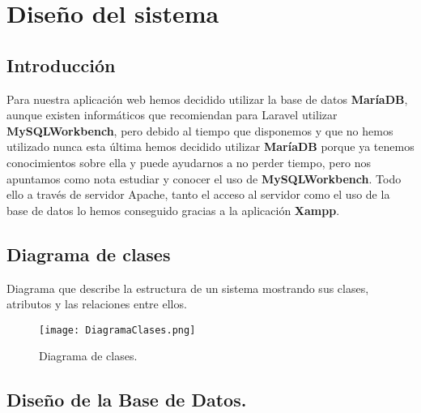 \documentclass{article}
\begin{document}
\section{Diseño del sistema }
\subsection{Introducción}
Para nuestra aplicación web hemos decidido utilizar la base de datos \textbf{MaríaDB}, aunque existen informáticos que recomiendan para Laravel utilizar \textbf{MySQLWorkbench}, pero debido al tiempo que disponemos y que no hemos utilizado nunca esta última hemos decidido utilizar \textbf{MaríaDB} porque ya tenemos conocimientos sobre ella y puede ayudarnos a no perder tiempo, pero nos apuntamos como nota estudiar y conocer el uso de \textbf{MySQLWorkbench}.
Todo ello a través de servidor Apache, tanto el acceso al servidor como el uso de la base de datos lo hemos conseguido gracias a la aplicación \textbf{Xampp}.


\subsection{Diagrama de clases}
Diagrama que describe la estructura de un sistema mostrando sus clases, atributos y las relaciones entre ellos. 

\begin{figure}[h] 
\centering
\texttt{[image: DiagramaClases.png]}
\caption{\label{fig:diaClass}Diagrama de clases.}
\end{figure}
\subsection{Diseño de la Base de Datos.}
\end{document}
